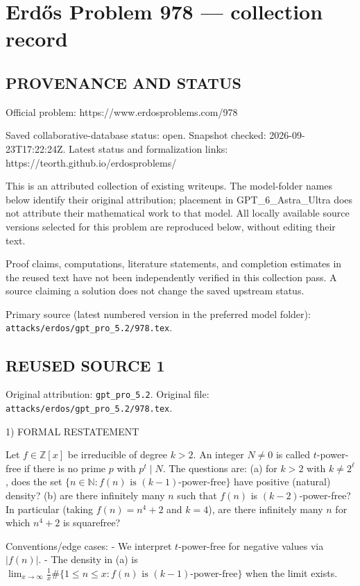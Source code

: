 \section*{Erd\H{o}s Problem 978 --- collection record}

\subsection*{PROVENANCE AND STATUS}
Official problem: https://www.erdosproblems.com/978

Saved collaborative-database status: open.
Snapshot checked: 2026-09-23T17:22:24Z.
Latest status and formalization links: https://teorth.github.io/erdosproblems/

This is an attributed collection of existing writeups. The model-folder names below identify their original attribution; placement in GPT\_6\_Astra\_Ultra does not attribute their mathematical work to that model. All locally available source versions selected for this problem are reproduced below, without editing their text.

Proof claims, computations, literature statements, and completion estimates in the reused text have not been independently verified in this collection pass. A source claiming a solution does not change the saved upstream status.

Primary source (latest numbered version in the preferred model folder): \texttt{attacks/erdos/gpt\_pro\_5.2/978.tex}.

\subsection*{REUSED SOURCE 1}
Original attribution: \texttt{gpt\_pro\_5.2}.
Original file: \texttt{attacks/erdos/gpt\_pro\_5.2/978.tex}.


1) FORMAL RESTATEMENT

Let $f\in\mathbb Z[x]$ be irreducible of degree $k>2$.
An integer $N\ne 0$ is called $t$-power-free if there is no prime $p$ with $p^t\mid N$.
The questions are:
(a) for $k>2$ with $k\ne 2^\ell$, does the set $\{n\in\mathbb N: f(n)\text{ is }(k-1)\text{-power-free}\}$ have positive (natural) density?
(b) are there infinitely many $n$ such that $f(n)$ is $(k-2)$-power-free?
In particular (taking $f(n)=n^4+2$ and $k=4$), are there infinitely many $n$ for which $n^4+2$ is squarefree?

Conventions/edge cases:
- We interpret $t$-power-free for negative values via $|f(n)|$.
- The density in (a) is $\lim_{x\to\infty}\frac1x\#\{1\le n\le x: f(n)\text{ is }(k-1)\text{-power-free}\}$ when the limit exists.

